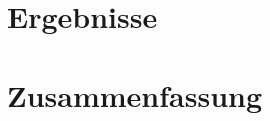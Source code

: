 \documentclass[a4paper,12pt,bibliography=totocnumbered]{scrartcl}
\begin{document}
\section{Ergebnisse}




\cite{FeDiff}

\section{Zusammenfassung}



\printbibliography[title={Literatur}]
\end{document}
